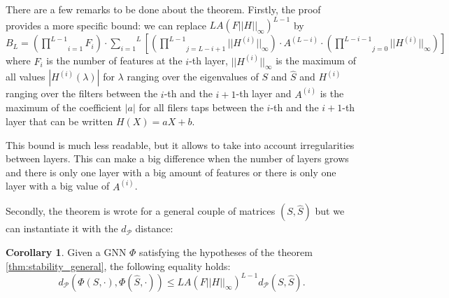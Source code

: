 \documentclass[11pt,a4paper]{article}
\newcommand{\cP}{\mathcal{P}}
\newcommand{\ninf}[1]{|| #1 ||_\infty}
\newcommand{\Sum}[2]{\overset{#2}{\underset{#1}{\sum}}}
\theoremstyle{definition}
\newtheorem{corollary}{Corollary}[theorem]
\renewcommand{\leq}{\leqslant}
\begin{document}
        There are a few remarks to be done about the theorem. Firstly, the proof provides a more specific bound: we can replace  $L A (F \ninf{H} )^ {L-1}$ by $B_L = \left( \underset{i=1}{\overset{L-1}{\prod}} F_i \right)  \cdot \Sum{i=1}{L} \left[ (\underset{j=L-i+1}{\overset{L-1}{\prod}} \ninf{H ^{(i)}}) \cdot A^{(L-i)} \cdot (\underset{j=0}{\overset{L-i-1}{\prod}} \ninf{H ^{(i)}}) \right] $ where $F_i$ is the number of features at the $i$-th layer, $\ninf{H^{(i)}}$ is the maximum of all values $|H^{(i)}(\lambda)|$ for $\lambda$ ranging over the eigenvalues of $S$ and $\hat{S}$ and $H^{(i)}$ ranging over the filters between the $i$-th and the $i+1$-th layer and $A^{(i)}$ is the maximum of the coefficient $|a|$ for all filers taps between the $i$-th and the $i+1$-th layer that can be written $H(X)=aX+b$.

        This bound is much less readable, but it allows to take into account irregularities between layers. This can make a big difference when the number of layers grows and there is only one layer with a big amount of features or there is only one layer with a big value of $A^{(i)}$.

        Secondly, the theorem is wrote for a general couple of matrices $(S,\hat{S})$ but we can instantiate it with the $d_\cP$ distance:

        \begin{corollary}
        Given a GNN $\Phi$ satisfying the hypotheses of the theorem \ref{thm:stability_general}, the following equality holds:
            $$ d_\cP(\Phi(S,\cdot),\Phi(\hat{S},\cdot)) \leq LA (F \ninf{H} )^ {L-1} d_\cP (S,\hat{S}).$$
        \end{corollary}
\end{document}

